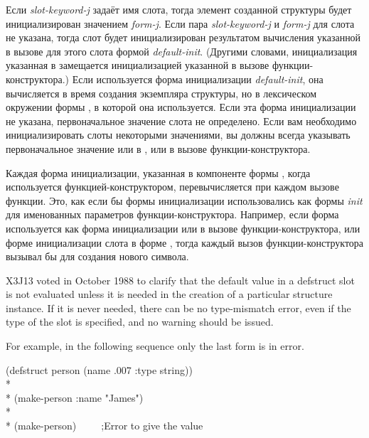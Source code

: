 \label{defstruct-initialization}
Если \emph{slot-keyword-j} задаёт имя слота, тогда элемент созданной структуры
будет инициализирован значением \emph{form-j}.
Если пара \emph{slot-keyword-j} и \emph{form-j} для слота не указана, тогда слот
будет инициализирован результатом вычисления указанной в вызове 
для этого слота формой \emph{default-init}.
(Другими словами, инициализация указанная в  замещается
инициализацией указанной в вызове функции-конструктора.)
Если используется форма инициализации \emph{default-init}, она вычисляется в
время создания экземпляра структуры, но в лексическом окружении формы
, в которой она используется.
Если эта форма инициализации не указана, первоначальное значение слота не
определено.
Если вам необходимо инициализировать слоты некоторыми значениями, вы должны
всегда указывать первоначальное значение или в , или в 
вызове функции-конструктора. 

Каждая форма инициализации, указанная в компоненте формы , когда
используется функцией-конструктором, перевычисляется при каждом вызове
функции. Это, как если бы формы инициализации использовались как формы
\emph{init} для именованных параметров функции-конструктора.
Например, если форма  используется как форма инициализации или в
вызове функции-конструктора, или форме инициализации слота в форме
, тогда каждый вызов функции-конструктора вызывал бы 
для создания нового символа.

\begin{newer}
X3J13 voted in October 1988 
to clarify that the default value in a defstruct slot is not evaluated 
        unless it is needed in the creation of a particular structure
        instance.  If it is never needed, there can be no type-mismatch
        error, even if the type of the slot is specified, and no warning
        should be issued.


For example, in the following sequence only the last form is in error.
\begin{lisp}
(defstruct person (name .007 :type string)) \\*
\\*
(make-person :name "James") \\*
\\*
(make-person)~~~~~;\textrm{Error to give  the value }
\end{lisp}
\end{newer}


